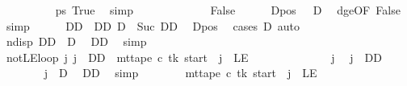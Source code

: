 \begin{isabellebody}
\ \ \ \ \ \ \ \ \isamarkupfalse%
\ ps\ True\ \isamarkupfalse%
\ simp\isanewline
\ \ \ \ \isamarkupfalse%
\isanewline
\ \ \isamarkupfalse%
\isanewline
\ \ \ \ \isamarkupfalse%
\ False\isanewline
\ \ \ \ \isamarkupfalse%
\ Dpos{\isacharcolon}{\kern0pt}\ {\isachardoublequoteopen}{}\ {\isacharless}{\kern0pt}\ {\isacharquery}{\kern0pt}D{\isachardoublequoteclose}\ \isamarkupfalse%
\ dge{}{\isacharbrackleft}{\kern0pt}OF\ False{\isacharbrackright}{\kern0pt}\ \isamarkupfalse%
\ simp\isanewline
\ \ \ \ \isamarkupfalse%
\ DD\ \ DD{\isacharcolon}{\kern0pt}\ {\isachardoublequoteopen}{\isacharquery}{\kern0pt}D\ {\isacharequal}{\kern0pt}\ Suc\ DD{\isachardoublequoteclose}\ \isamarkupfalse%
\ Dpos\ \isamarkupfalse%
\ {\isacharparenleft}{\kern0pt}cases\ {\isacharquery}{\kern0pt}D{\isacharparenright}{\kern0pt}\ auto\isanewline
\ \ \ \ \isamarkupfalse%
\ ndisp{\isacharcolon}{\kern0pt}\ {\isachardoublequoteopen}DD\ {\isacharless}{\kern0pt}\ {\isacharquery}{\kern0pt}D{\isachardoublequoteclose}\ \isamarkupfalse%
\ DD\ \isamarkupfalse%
\ simp\isanewline
\ \ \ \ \isamarkupfalse%
\ notLE{\isacharunderscore}{\kern0pt}loop{\isacharcolon}{\kern0pt}\ {\isachardoublequoteopen}{\isasymAnd}j{\isachardot}{\kern0pt}\ j\ {\isacharless}{\kern0pt}\ DD\ {\isasymLongrightarrow}\ mt{\isacharunderscore}{\kern0pt}tape\ c{}\ tk\ {\isacharparenleft}{\kern0pt}{\isacharquery}{\kern0pt}start\ {\isacharminus}{\kern0pt}\ j{\isacharparenright}{\kern0pt}\ {\isasymnoteq}\ LE{}{\isachardoublequoteclose}\isanewline
\ \ \ \ \isamarkupfalse%
\ {\isacharminus}{\kern0pt}\isanewline
\ \ \ \ \ \ \isamarkupfalse%
\ j\ \isamarkupfalse%
\ {\isachardoublequoteopen}j\ {\isacharless}{\kern0pt}\ DD{\isachardoublequoteclose}\isanewline
\ \ \ \ \ \ \isamarkupfalse%
\ {\isachardoublequoteopen}j\ {\isacharless}{\kern0pt}\ {\isacharquery}{\kern0pt}D{\isachardoublequoteclose}\ \isamarkupfalse%
\ DD\ \isamarkupfalse%
\ simp\isanewline
\ \ \ \ \ \ \isamarkupfalse%
\ {\isachardoublequoteopen}mt{\isacharunderscore}{\kern0pt}tape\ c{}\ tk\ {\isacharparenleft}{\kern0pt}{\isacharquery}{\kern0pt}start\ {\isacharminus}{\kern0pt}\ j{\isacharparenright}{\kern0pt}\ {\isasymnoteq}\ LE{}{\isachardoublequoteclose}\ \isamarkupfalse%

\end{isabellebody}
